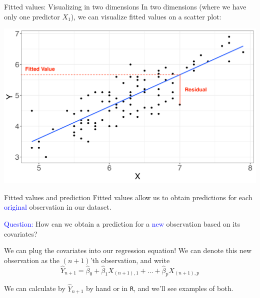 \documentclass[10pt,t]{beamer}
\begin{document}
%

\begin{frame}{Fitted values: Visualizing in two dimensions}
In two dimensions (where we have only one predictor $X_1$), we can visualize fitted values on a scatter plot:
\bigskip

\centering \includegraphics[scale=0.4]{figures/fitted_vals2.png}
\end{frame}

\begin{frame}{Fitted values and prediction}
Fitted values allow us to obtain predictions for each \textcolor{blue}{original} observation in our dataset.  

\vspace{0.3cm} 

\textcolor{blue}{Question:} How can we obtain a prediction for a \textcolor{blue}{new} observation based on its covariates? 

\vspace{0.3cm}

We can plug the covariates into our regression equation! We can denote this new observation as the $(n + 1)$'th observation, and write
$$
\hat{Y}_{n + 1} = \hat{\beta}_0 + \hat{\beta}_1 X_{(n + 1), 1} + \dots + \hat{\beta}_p X_{(n + 1), p}
$$
\medskip

We can calculate by $\hat{Y}_{n + 1}$ by hand or in \texttt{R}, and we'll see examples of both.

\end{frame}
\end{document}
